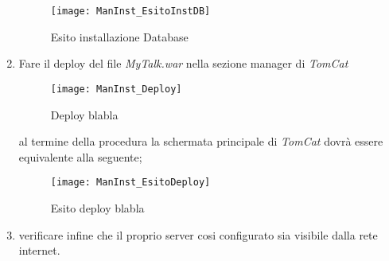 \begin{enumerate}
\begin{figure}[H]
  \texttt{[image: ManInst\_EsitoInstDB]}
\caption{Esito installazione Database}\label{fig:EsitoInstDB}
\end{figure}


\item Fare il deploy del file \textit{MyTalk.war} nella sezione manager di \textit{TomCat}

\begin{figure}[H]
  \texttt{[image: ManInst\_Deploy]}
\caption{Deploy blabla}\label{fig:Deploy}
\end{figure}

al termine della procedura la schermata principale di \textit{TomCat} dovrà essere equivalente alla seguente;

\begin{figure}[H]
  \texttt{[image: ManInst\_EsitoDeploy]}
\caption{Esito deploy blabla}\label{fig:EsitoDeploy}
\end{figure}


\item verificare infine che il proprio server cosi configurato sia visibile dalla rete internet.
\end{enumerate}



